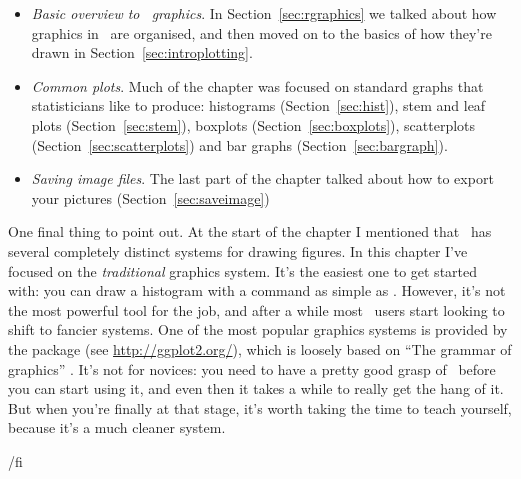 \begin{itemize}
\item {\it Basic overview to \R\ graphics}. In Section~\ref{sec:rgraphics} we talked about how graphics in \R\ are organised, and then moved on to the basics of how they're drawn in Section~\ref{sec:introplotting}.
\item {\it Common plots}. Much of the chapter was focused on standard graphs that statisticians like to produce: histograms (Section~\ref{sec:hist}), stem and leaf plots (Section~\ref{sec:stem}), boxplots (Section~\ref{sec:boxplots}), scatterplots (Section~\ref{sec:scatterplots}) and bar graphs (Section~\ref{sec:bargraph}).
\item {\it Saving image files}. The last part of the chapter talked about how to export your pictures (Section~\ref{sec:saveimage})
\end{itemize} 

\noindent
One final thing to point out. At the start of the chapter I mentioned that \R\ has several completely distinct systems for drawing figures. In this chapter I've focused on the {\it traditional} graphics system. It's the easiest one to get started with: you can draw a histogram with a command as simple as . However, it's not the most powerful tool for the job, and after a while most \R\ users start looking to shift to fancier systems. One of the most popular graphics systems is provided by the  package (see \url{http://ggplot2.org/}), which is loosely based on ``The grammar of graphics'' \cite{Wilkinson2006}. It's not for novices: you need to have a pretty good grasp of \R\ before you can start using it, and even then it takes a while to really get the hang of it. But when you're finally at that stage, it's worth taking the time to teach yourself, because it's a much cleaner system.




/fi %

